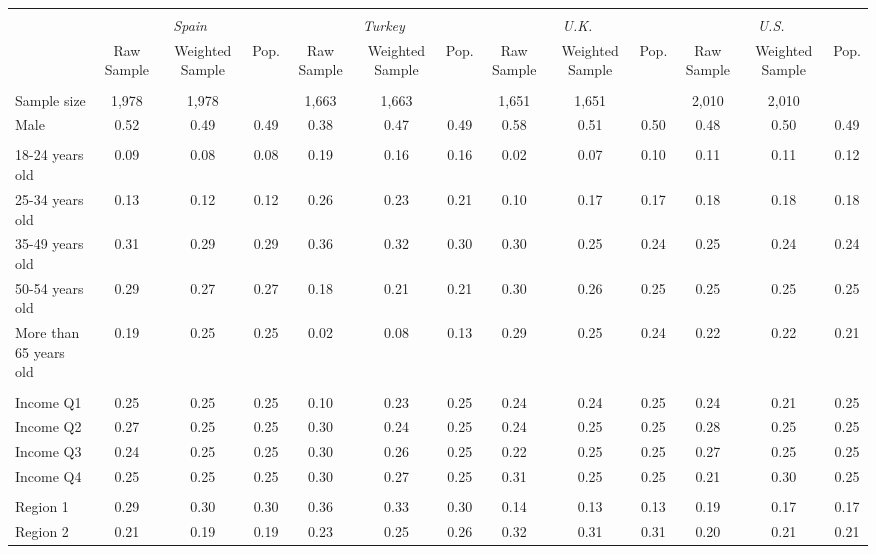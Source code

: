 \begin{tabular}{l*{12}{c}}
\toprule
\hline \\[-1.8ex]
\multicolumn{1}{c}{\em{ }} & \multicolumn{3}{c}{\em{Spain}} & \multicolumn{3}{c}{\em{Turkey}} & \multicolumn{3}{c}{\em{U.K.}} & \multicolumn{3}{c}{\em{U.S.}} \\
\cmidrule(l{3pt}r{3pt}){2-4} \cmidrule(l{3pt}r{3pt}){5-7} \cmidrule(l{3pt}r{3pt}){8-10} \cmidrule(l{3pt}r{3pt}){11-13}
\noalign{\smallskip}  & Raw Sample & Weighted Sample & Pop. & Raw Sample & Weighted Sample & Pop. & Raw Sample & Weighted Sample & Pop. & Raw Sample & Weighted Sample & Pop. \\
\hline \\[-1.8ex] 
Sample size & 1,978 & 1,978 & & 1,663 & 1,663 & & 1,651 & 1,651 & & 2,010 & 2,010 & \\
\noalign{\smallskip}\hline \noalign{\smallskip}Male & 0.52 & 0.49 & 0.49 & 0.38 & 0.47 & 0.49 & 0.58 & 0.51 & 0.50 & 0.48 & 0.50 & 0.49 \\ 
\\
18-24 years old & 0.09 & 0.08 & 0.08 & 0.19 & 0.16 & 0.16 & 0.02 & 0.07 & 0.10 & 0.11 & 0.11 & 0.12 \\
25-34 years old & 0.13 & 0.12 & 0.12 & 0.26 & 0.23 & 0.21 & 0.10 & 0.17 & 0.17 & 0.18 & 0.18 & 0.18 \\
35-49 years old & 0.31 & 0.29 & 0.29 & 0.36 & 0.32 & 0.30 & 0.30 & 0.25 & 0.24 & 0.25 & 0.24 & 0.24 \\
50-54 years old & 0.29 & 0.27 & 0.27 & 0.18 & 0.21 & 0.21 & 0.30 & 0.26 & 0.25 & 0.25 & 0.25 & 0.25 \\
More than 65 years old & 0.19 & 0.25 & 0.25 & 0.02 & 0.08 & 0.13 & 0.29 & 0.25 & 0.24 & 0.22 & 0.22 & 0.21 \\ 
\\
Income Q1 & 0.25 & 0.25 & 0.25 & 0.10 & 0.23 & 0.25 & 0.24 & 0.24 & 0.25 & 0.24 & 0.21 & 0.25 \\
Income Q2 & 0.27 & 0.25 & 0.25 & 0.30 & 0.24 & 0.25 & 0.24 & 0.25 & 0.25 & 0.28 & 0.25 & 0.25 \\
Income Q3 & 0.24 & 0.25 & 0.25 & 0.30 & 0.26 & 0.25 & 0.22 & 0.25 & 0.25 & 0.27 & 0.25 & 0.25 \\
Income Q4 & 0.25 & 0.25 & 0.25 & 0.30 & 0.27 & 0.25 & 0.31 & 0.25 & 0.25 & 0.21 & 0.30 & 0.25 \\
\\
Region 1 & 0.29 & 0.30 & 0.30 & 0.36 & 0.33 & 0.30 & 0.14 & 0.13 & 0.13 & 0.19 & 0.17 & 0.17 \\
Region 2 & 0.21 & 0.19 & 0.19 & 0.23 & 0.25 & 0.26 & 0.32 & 0.31 & 0.31 & 0.20 & 0.21 & 0.21 \\

\end{tabular}
